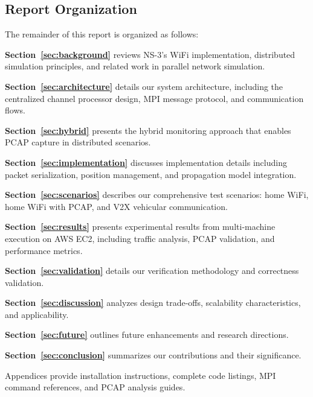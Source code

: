 \subsection{Report Organization}

The remainder of this report is organized as follows:

\textbf{Section~\ref{sec:background}} reviews NS-3's WiFi implementation, distributed simulation principles, and related work in parallel network simulation.

\textbf{Section~\ref{sec:architecture}} details our system architecture, including the centralized channel processor design, MPI message protocol, and communication flows.

\textbf{Section~\ref{sec:hybrid}} presents the hybrid monitoring approach that enables PCAP capture in distributed scenarios.

\textbf{Section~\ref{sec:implementation}} discusses implementation details including packet serialization, position management, and propagation model integration.

\textbf{Section~\ref{sec:scenarios}} describes our comprehensive test scenarios: home WiFi, home WiFi with PCAP, and V2X vehicular communication.

\textbf{Section~\ref{sec:results}} presents experimental results from multi-machine execution on AWS EC2, including traffic analysis, PCAP validation, and performance metrics.

\textbf{Section~\ref{sec:validation}} details our verification methodology and correctness validation.

\textbf{Section~\ref{sec:discussion}} analyzes design trade-offs, scalability characteristics, and applicability.

\textbf{Section~\ref{sec:future}} outlines future enhancements and research directions.

\textbf{Section~\ref{sec:conclusion}} summarizes our contributions and their significance.

Appendices provide installation instructions, complete code listings, MPI command references, and PCAP analysis guides.
